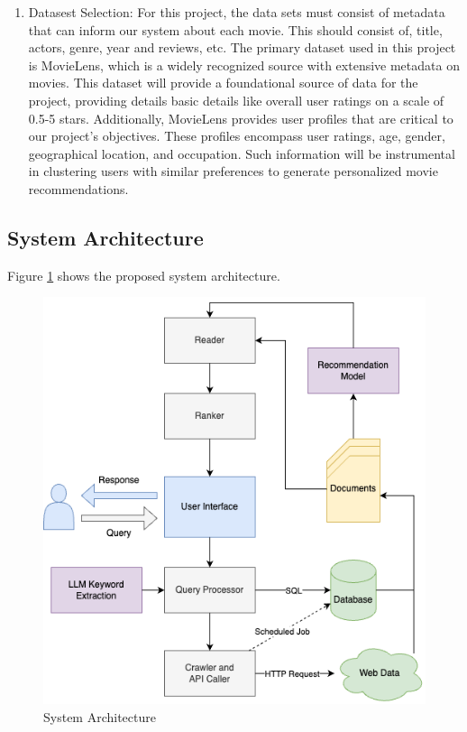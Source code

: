 \documentclass[journal]{IEEEtran}
\begin{document}
\begin{enumerate}
    \item{Datasest Selection}: For this project, the data sets must consist of metadata that can inform our system about each movie. This should consist of, title, actors, genre, year and reviews, etc. The primary dataset used in this project is MovieLens, which is a widely recognized source with extensive metadata on movies. This dataset will provide a foundational source of data for the project, providing details basic details like overall user ratings on a scale of 0.5-5 stars. Additionally, MovieLens provides user profiles that are critical to our project's objectives. These profiles encompass user ratings, age, gender, geographical location, and occupation. Such information will be instrumental in clustering users with similar preferences to generate personalized movie recommendations.

    
\end{enumerate}

\subsection{System Architecture}
Figure \ref{fig:sysarch} shows the proposed system architecture.

\begin{figure}
    \centering
    \includegraphics[width=1.0\linewidth]{doc//proposal//assets/sysarch.drawio.png}
    \caption{System Architecture}
    \label{fig:sysarch}
\end{figure}
\end{document}
